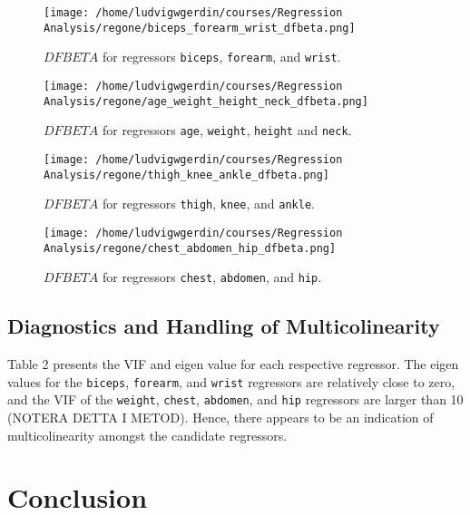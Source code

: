\documentclass[11pt]{article}
\begin{document}
\begin{figure}[h]
\centering
\texttt{[image: /home/ludvigwgerdin/courses/Regression Analysis/regone/biceps\_forearm\_wrist\_dfbeta.png]}
\caption{\label{fig:org19956b9}
\(DFBETA\) for regressors \texttt{biceps}, \texttt{forearm}, and \texttt{wrist}.}
\end{figure}

\begin{figure}[h]
\centering
\texttt{[image: /home/ludvigwgerdin/courses/Regression Analysis/regone/age\_weight\_height\_neck\_dfbeta.png]}
\caption{\label{fig:org1d7d892}
\(DFBETA\) for regressors \texttt{age}, \texttt{weight}, \texttt{height} and \texttt{neck}.}
\end{figure}

\begin{figure}[h]
\centering
\texttt{[image: /home/ludvigwgerdin/courses/Regression Analysis/regone/thigh\_knee\_ankle\_dfbeta.png]}
\caption{\label{fig:org622d32f}
\(DFBETA\) for regressors \texttt{thigh}, \texttt{knee}, and \texttt{ankle}.}
\end{figure}

\begin{figure}[h]
\centering
\texttt{[image: /home/ludvigwgerdin/courses/Regression Analysis/regone/chest\_abdomen\_hip\_dfbeta.png]}
\caption{\label{fig:orgf0fec03}
\(DFBETA\) for regressors \texttt{chest}, \texttt{abdomen}, and \texttt{hip}.}
\end{figure}

\subsection{Diagnostics and Handling of Multicolinearity}
\label{sec:org8581a3d}

Table 2 presents the VIF and eigen value for each respective regressor. The eigen values for the \texttt{biceps},
\texttt{forearm}, and \texttt{wrist} regressors are relatively close to zero, and the VIF of the \texttt{weight},
\texttt{chest}, \texttt{abdomen}, and \texttt{hip} regressors are larger than 10 (NOTERA DETTA I METOD). Hence, there appears 
to be an indication of multicolinearity amongst the candidate regressors.

 

\newpage
\section{Conclusion}
\label{sec:org0436e03}


\end{document}
